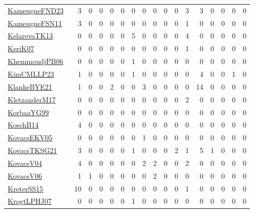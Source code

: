 {\begin{longtable}{l*{16}{r}}
\href{papers/KameugneFND23.pdf}{KameugneFND23}~\cite{KameugneFND23} & 3 & 0 & 0 & 0 & 0 & 0 & 0 & 0 & 0 & 0 & 3 & 3 & 0 & 0 & 0 & 0\\
\href{papers/KameugneFSN11.pdf}{KameugneFSN11}~\cite{KameugneFSN11} & 3 & 0 & 0 & 0 & 0 & 0 & 0 & 0 & 0 & 0 & 1 & 0 & 0 & 0 & 0 & 0\\
\href{papers/KelarevaTK13.pdf}{KelarevaTK13}~\cite{KelarevaTK13} & 0 & 0 & 0 & 0 & 0 & 5 & 0 & 0 & 0 & 0 & 4 & 0 & 0 & 0 & 0 & 0\\
\href{papers/KeriK07.pdf}{KeriK07}~\cite{KeriK07} & 0 & 0 & 0 & 0 & 0 & 0 & 0 & 0 & 0 & 0 & 1 & 0 & 0 & 0 & 0 & 0\\
\href{papers/KhemmoudjPB06.pdf}{KhemmoudjPB06}~\cite{KhemmoudjPB06} & 0 & 0 & 0 & 0 & 0 & 1 & 0 & 0 & 0 & 0 & 0 & 0 & 0 & 0 & 0 & 0\\
\href{papers/KimCMLLP23.pdf}{KimCMLLP23}~\cite{KimCMLLP23} & 1 & 0 & 0 & 0 & 0 & 1 & 0 & 0 & 0 & 0 & 0 & 4 & 0 & 0 & 1 & 0\\
\href{papers/KlankeBYE21.pdf}{KlankeBYE21}~\cite{KlankeBYE21} & 1 & 0 & 0 & 2 & 0 & 0 & 3 & 0 & 0 & 0 & 0 & 14 & 0 & 0 & 0 & 0\\
\href{papers/KletzanderM17.pdf}{KletzanderM17}~\cite{KletzanderM17} & 0 & 0 & 0 & 0 & 0 & 0 & 0 & 0 & 0 & 0 & 2 & 0 & 0 & 0 & 0 & 0\\
\href{papers/KorbaaYG99.pdf}{KorbaaYG99}~\cite{KorbaaYG99} & 0 & 0 & 0 & 0 & 0 & 0 & 0 & 0 & 0 & 0 & 0 & 0 & 0 & 0 & 0 & 0\\
\href{papers/KoschB14.pdf}{KoschB14}~\cite{KoschB14} & 4 & 0 & 0 & 0 & 0 & 0 & 0 & 0 & 0 & 0 & 0 & 0 & 0 & 0 & 0 & 0\\
\href{papers/KovacsEKV05.pdf}{KovacsEKV05}~\cite{KovacsEKV05} & 0 & 0 & 0 & 0 & 0 & 0 & 1 & 0 & 0 & 0 & 0 & 0 & 0 & 0 & 0 & 0\\
\href{papers/KovacsTKSG21.pdf}{KovacsTKSG21}~\cite{KovacsTKSG21} & 3 & 0 & 0 & 0 & 0 & 1 & 0 & 0 & 0 & 2 & 1 & 5 & 1 & 0 & 0 & 0\\
\href{papers/KovacsV04.pdf}{KovacsV04}~\cite{KovacsV04} & 4 & 0 & 0 & 0 & 0 & 0 & 2 & 2 & 0 & 0 & 2 & 0 & 0 & 0 & 0 & 0\\
\href{papers/KovacsV06.pdf}{KovacsV06}~\cite{KovacsV06} & 1 & 1 & 0 & 0 & 0 & 0 & 0 & 2 & 0 & 0 & 0 & 0 & 0 & 0 & 0 & 0\\
\href{papers/KreterSS15.pdf}{KreterSS15}~\cite{KreterSS15} & 10 & 0 & 0 & 0 & 0 & 0 & 0 & 0 & 0 & 0 & 1 & 0 & 0 & 0 & 0 & 0\\
\href{papers/KrogtLPHJ07.pdf}{KrogtLPHJ07}~\cite{KrogtLPHJ07} & 0 & 0 & 0 & 0 & 0 & 1 & 0 & 0 & 0 & 0 & 0 & 0 & 0 & 0 & 0 & 0\\

\end{longtable}}
